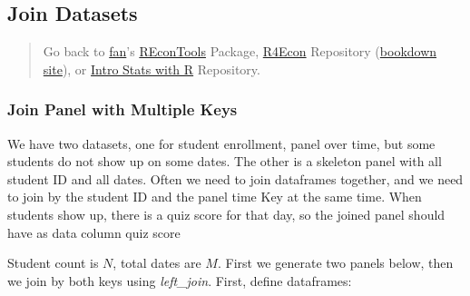 \documentclass[
]{book}
\newenvironment{Shaded}{\begin{snugshade}}{\end{snugshade}}
\newcommand{\CommentTok}[1]{\textcolor[rgb]{0.56,0.35,0.01}{\textit{#1}}}
\newcommand{\DataTypeTok}[1]{\textcolor[rgb]{0.13,0.29,0.53}{#1}}
\newcommand{\DecValTok}[1]{\textcolor[rgb]{0.00,0.00,0.81}{#1}}
\newcommand{\ErrorTok}[1]{\textcolor[rgb]{0.64,0.00,0.00}{\textbf{#1}}}
\newcommand{\KeywordTok}[1]{\textcolor[rgb]{0.13,0.29,0.53}{\textbf{#1}}}
\newcommand{\NormalTok}[1]{#1}
\newcommand{\OperatorTok}[1]{\textcolor[rgb]{0.81,0.36,0.00}{\textbf{#1}}}
\newcommand{\StringTok}[1]{\textcolor[rgb]{0.31,0.60,0.02}{#1}}
\begin{document}
\hypertarget{join-datasets}{%
\subsection{Join Datasets}\label{join-datasets}}

\begin{quote}
Go back to \href{http://fanwangecon.github.io/}{fan}'s \href{https://fanwangecon.github.io/REconTools/}{REconTools} Package, \href{https://fanwangecon.github.io/R4Econ/}{R4Econ} Repository (\href{https://fanwangecon.github.io/R4Econ/bookdown}{bookdown site}), or \href{https://fanwangecon.github.io/Stat4Econ/}{Intro Stats with R} Repository.
\end{quote}

\hypertarget{join-panel-with-multiple-keys}{%
\subsubsection{Join Panel with Multiple Keys}\label{join-panel-with-multiple-keys}}

We have two datasets, one for student enrollment, panel over time, but some students do not show up on some dates. The other is a skeleton panel with all student ID and all dates. Often we need to join dataframes together, and we need to join by the student ID and the panel time Key at the same time. When students show up, there is a quiz score for that day, so the joined panel should have as data column quiz score

Student count is \(N\), total dates are \(M\). First we generate two panels below, then we join by both keys using \emph{left\_join}. First, define dataframes:

\begin{Shaded}
\end{Shaded}
\end{document}

